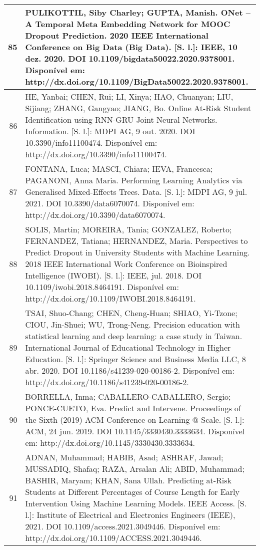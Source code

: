 \begin{apendicesenv}
\begin{longtable}[c]{|r|l|}
85 &
  \multicolumn{1}{p{14.5cm}|}{PULIKOTTIL, Siby Charley; GUPTA, Manish. ONet – A Temporal Meta Embedding Network for MOOC Dropout Prediction. 2020 IEEE International Conference on Big Data (Big Data). {[}S. l.{]}: IEEE, 10 dez. 2020. DOI 10.1109/bigdata50022.2020.9378001. Disponível em: http://dx.doi.org/10.1109/BigData50022.2020.9378001.} \\ \hline
86 &
  \multicolumn{1}{p{14.5cm}|}{HE, Yanbai; CHEN, Rui; LI, Xinya; HAO, Chuanyan; LIU, Sijiang; ZHANG, Gangyao; JIANG, Bo. Online At-Risk Student Identification using RNN-GRU Joint Neural Networks. Information. {[}S. l.{]}: MDPI AG, 9 out. 2020. DOI 10.3390/info11100474. Disponível em: http://dx.doi.org/10.3390/info11100474.} \\ \hline
87 &
  \multicolumn{1}{p{14.5cm}|}{FONTANA, Luca; MASCI, Chiara; IEVA, Francesca; PAGANONI, Anna Maria. Performing Learning Analytics via Generalised Mixed-Effects Trees. Data. {[}S. l.{]}: MDPI AG, 9 jul. 2021. DOI 10.3390/data6070074. Disponível em: http://dx.doi.org/10.3390/data6070074.} \\ \hline
88 &
  \multicolumn{1}{p{14.5cm}|}{SOLIS, Martin; MOREIRA, Tania; GONZALEZ, Roberto; FERNANDEZ, Tatiana; HERNANDEZ, Maria. Perspectives to Predict Dropout in University Students with Machine Learning. 2018 IEEE International Work Conference on Bioinspired Intelligence (IWOBI). {[}S. l.{]}: IEEE, jul. 2018. DOI 10.1109/iwobi.2018.8464191. Disponível em: http://dx.doi.org/10.1109/IWOBI.2018.8464191.} \\ \hline
89 &
  \multicolumn{1}{p{14.5cm}|}{TSAI, Shuo-Chang; CHEN, Cheng-Huan; SHIAO, Yi-Tzone; CIOU, Jin-Shuei; WU, Trong-Neng. Precision education with statistical learning and deep learning: a case study in Taiwan. International Journal of Educational Technology in Higher Education. {[}S. l.{]}: Springer Science and Business Media LLC, 8 abr. 2020. DOI 10.1186/s41239-020-00186-2. Disponível em: http://dx.doi.org/10.1186/s41239-020-00186-2.} \\ \hline
90 &
  \multicolumn{1}{p{14.5cm}|}{BORRELLA, Inma; CABALLERO-CABALLERO, Sergio; PONCE-CUETO, Eva. Predict and Intervene. Proceedings of the Sixth (2019) ACM Conference on Learning @ Scale. {[}S. l.{]}: ACM, 24 jun. 2019. DOI 10.1145/3330430.3333634. Disponível em: http://dx.doi.org/10.1145/3330430.3333634.} \\ \hline
91 &
  \multicolumn{1}{p{14.5cm}|}{ADNAN, Muhammad; HABIB, Asad; ASHRAF, Jawad; MUSSADIQ, Shafaq; RAZA, Arsalan Ali; ABID, Muhammad; BASHIR, Maryam; KHAN, Sana Ullah. Predicting at-Risk Students at Different Percentages of Course Length for Early Intervention Using Machine Learning Models. IEEE Access. {[}S. l.{]}: Institute of Electrical and Electronics Engineers (IEEE), 2021. DOI 10.1109/access.2021.3049446. Disponível em: http://dx.doi.org/10.1109/ACCESS.2021.3049446.} \\ \hline

\end{longtable}
\end{apendicesenv}
